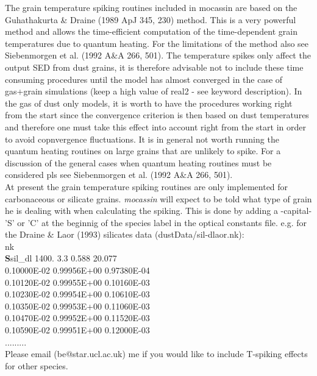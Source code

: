 \documentclass[11pt]{article}
\begin{document}
   The grain temperature spiking routines included in {\sc mocassin} are based on the Guhathakurta \& Draine (1989 ApJ 345, 230) method. This is a very powerful method and allows the time-efficient computation of the time-dependent grain temperatures due to quantum heating. For the limitations of the method also see Siebenmorgen et al. (1992 A\&A 266, 501). The temperature spikes only affect the output SED from dust grains, it is therefore advisable not to include these time consuming procedures until the model has almost converged in the case of gas+grain simulations (keep a high value of real2 - see keyword description). In the gas of dust only models, it is worth to have the procedures working right from the start since the convergence criterion is then based on dust temperatures and therefore one must take this effect into account right from the start in order to avoid copnvergence fluctuations. It is in general not worth running the quantum heating routines on large grains that are unlikely to spike. For a discussion of the general cases when quantum heating routines must be considered pls see Siebenmorgen et al. (1992 A\&A 266, 501). \\

At present the grain temperature spiking routines are only implemented for carbonaceous or silicate grains. {\it mocassin} will expect to be told what type of grain he is dealing with when calculating the spiking. This is done by adding a -capital- 'S' or 'C' at the beginnig of the species label in the optical constants file. e.g. for the Draine \& Laor (1993) silicates data (dustData/sil-dlaor.nk): \\
 nk\\
 {\bf S}sil\_dl  1400. 3.3  0.588 20.077\\
 0.10000E-02 0.99956E+00 0.97380E-04\\
 0.10120E-02 0.99955E+00 0.10160E-03\\
 0.10230E-02 0.99954E+00 0.10610E-03\\
 0.10350E-02 0.99953E+00 0.11060E-03\\
 0.10470E-02 0.99952E+00 0.11520E-03\\
 0.10590E-02 0.99951E+00 0.12000E-03\\
 .........\\
Please email (be@star.ucl.ac.uk) me if you would like to include T-spiking effects for other species. \\



\pagebreak
\end{document}
